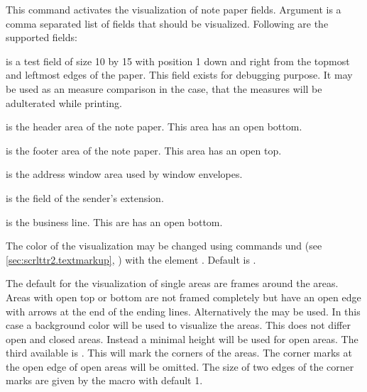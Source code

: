 \begin{Declaration}
\end{Declaration}
This command activates the visualization of note paper fields. Argument
 is a comma separated list of fields that should be
visualized. Following are the supported fields:
\begin{labeling}[~--]{}
\item[\PValue{test}] is a test field of size 10 by 15 with
  position 1 down and right from the topmost and leftmost edges of
  the paper. This field exists for debugging purpose. It may be used as an
  measure comparison in the case, that the measures will be adulterated while
  printing.
\item[\PValue{head}] is the header area of the note paper. This area has an
  open bottom.
\item[\PValue{foot}] is the footer area of the note paper. This area has an
  open top.
\item[\PValue{address}] is the address window area used by window envelopes.
\item[\PValue{location}] is the field of the sender's extension.
\item[\PValue{refline}] is the business line. This are has an open bottom.
\end{labeling}%
%
The color of the visualization may be changed using
commands und
 (see \autoref{sec:scrlttr2.textmarkup},
) with the element
. Default is
.%
%
%
\EndIndexGroup


\begin{Declaration}
\end{Declaration}
The default for the visualization of single areas are
frames around the areas. Areas with open top or
bottom are not framed completely but have an open edge with arrows at the end
of the ending lines. Alternatively the
  may be used. In this case a
background color will be used to visualize the areas. This does not differ open
and closed areas. Instead a minimal height will be used for open areas. The
third available  is
. This will mark the corners of the areas. The corner marks at
the open edge of open areas will be omitted. The size of two edges of the
corner marks are given by the macro  with default 1.%
\EndIndexGroup


